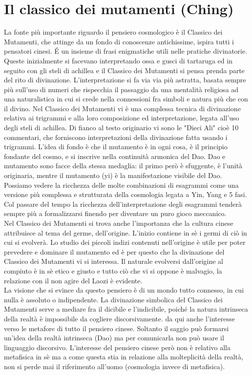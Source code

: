 \documentclass[10pt,a4paper]{report}
\begin{document}
\section{Il classico dei mutamenti (Ching)}
La fonte più importante riguardo il pensiero cosmologico è il Classico dei Mutamenti, che attinge da un fondo di conoscenze antichissime, ispira tutti i pensatori cinesi. \'E un insieme di frasi enigmatiche utili nelle pratiche divinatorie. Queste inizialmente si facevano interpretando ossa e gusci di tartaruga ed in seguito con gli steli di achillea e il Classico dei Mutamenti si pensa prenda parte del rito di divinazione. L'interpretazione si fa via via più astratta, basata sempre più sull'uso di numeri che rispecchia il passaggio da una mentalità religiosa ad una naturalistica in cui si crede nella connessioni fra simboli e natura più che con il divino. Nel Classico dei Mutamenti vi è una complessa tecnica di divinazione relativa ai trigrammi e alla loro composizione ed interpretazione, legata all'uso degli steli di achillea. Di fianco al testo originario vi sono le "Dieci Ali" cioè 10 commentari, che forniscono interpretazioni della divinazione fatta usando i trigrammi. L'idea di fondo è che il mutamento è in ogni cosa, è il principio fondante del cosmo, e si inscrive nella continuità armonica del Dao. Dao e mutamento sono facce della stessa medaglia: il primo però è sfuggente, è l'unità originaria, mentre il mutamento (yi) è la manifestazione visibile del Dao. Possiamo vedere la ricchezza delle molte combinazioni di esagrammi come una versione più complessa e strutturata della cosmologia legata a Yin, Yang e 5 fasi. Col passare del tempo la ricchezza dell'interpretazione degli esagrammi tenderà sempre più a formalizzarsi finendo per diventare un puro gioco meccanico.\\
Nel Classico dei Mutamenti si trova anche l'importanza che la cultura cinese attribuisce al tema del germe, dell'origine. L'inizio contiene in sè i germi di ciò in cui si evolverà. Lo studio dei piccoli indizi contenuti nell'origine è utile per poter prevedere e dominare il mutamento ed è per questo che la divinazione del Classico dei Mutamenti vi si interessa. Il naturale evolversi dall'origine al compiuto è in sè etico e giusto e tutto ciò che vi si oppone è malvagio, la relazione con il non agire del Laozi è evidente.\\
La visione che si evince da questo pensiero è di un mondo tutto connesso, in cui nulla è assoluto o indipendente. La divinazione simbolica del Classico dei Mutamenti serve a mediare fra il dicibile e l'indicibile, poiché la natura intrinseca della realtà è impossibile da cogliere discorsivamente. da qui anche l'interesse verso le metafore di tutto il pensiero cinese. Soltanto il saggio può formarsi un'idea della realtà intrinseca (Dao) ma per comunicarla non può usare il linguaggio discorsivo. L'interesse del pensiero cinese però non è relativo alla metafisica in sè ma a come questa stia in relazione alla molteplicità della realtà, non si perde mai il riferimento all'uomo (cosmologia invece di metafisica).
\end{document}
